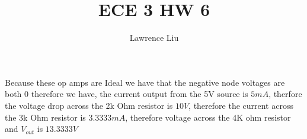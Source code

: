 \documentclass[12pt]{article}
\title{ECE 3 HW 6}
\author{Lawrence Liu}
\begin{document}
\maketitle
Because these op amps are Ideal we have that the negative node voltages are both $0$ therefore we have, the current output from the 5V source is $5mA$, therfore the
voltage drop across the 2k Ohm resistor is $10V$, therefore the current across the 3k Ohm resistor is $3.3333mA$, therefore voltage across the 4K ohm resistor and $V_{out}$ is
$\boxed{13.3333V}$
\end{document}
